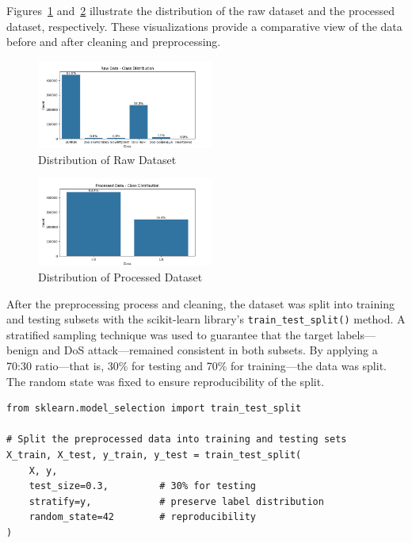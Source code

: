 \documentclass[conference]{IEEEtran}
\begin{document}
Figures~\ref{fig:raw_data} and~\ref{fig:processed_data} illustrate the distribution of the raw dataset and the processed dataset, respectively. These visualizations provide a comparative view of the data before and after cleaning and preprocessing.

\begin{figure}[htbp]
\centerline{\includegraphics[width=0.52\textwidth]{Raw_Data_Distribution.png}}
\caption{Distribution of Raw Dataset}
\label{fig:raw_data}
\end{figure}

\begin{figure}[htbp]
\centerline{\includegraphics[width=0.52\textwidth]{Processed_Data_Distribution.png}}
\caption{Distribution of Processed Dataset}
\label{fig:processed_data}
\end{figure}

After the preprocessing process and cleaning, the dataset was split into training and testing subsets with the scikit-learn library's \texttt{train\_test\_split()} method. A stratified sampling technique was used to guarantee that the target labels—benign and DoS attack—remained consistent in both subsets. By applying a 70:30 ratio—that is, 30\% for testing and 70\% for training—the data was split. The random state was fixed to ensure reproducibility of the split.
\begin{center}
\begin{scriptsize}
\begin{verbatim}
from sklearn.model_selection import train_test_split

# Split the preprocessed data into training and testing sets
X_train, X_test, y_train, y_test = train_test_split(
    X, y,
    test_size=0.3,         # 30% for testing
    stratify=y,            # preserve label distribution
    random_state=42        # reproducibility
)
\end{verbatim}
\end{scriptsize}
\end{center}
\end{document}
